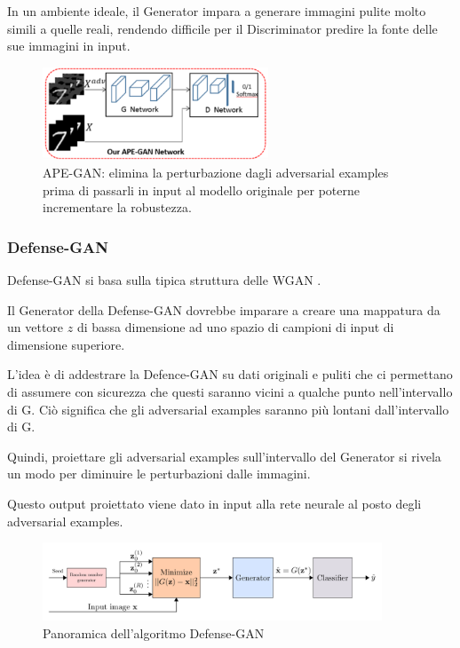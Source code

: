        In un ambiente ideale, il Generator impara a generare immagini pulite molto simili a quelle reali, rendendo difficile per il Discriminator predire la fonte delle sue immagini in input.
        \begin{figure}[!h]
            \centering
            \includegraphics[width=0.6\textwidth]{Images/Mitigation/APE-GAN.png}
            \caption{APE-GAN: elimina la perturbazione dagli adversarial examples prima di passarli in input al modello originale per poterne incrementare la robustezza.}
            \label{APE-GAN}
        \end{figure}
        
        \subsubsection{Defense-GAN}
        Defense-GAN %
        \cite{samangouei2018defense} si basa sulla tipica struttura delle WGAN %
        \cite{arjovsky2017wasserstein}. 
        
        Il Generator della Defense-GAN dovrebbe imparare a creare una mappatura da un vettore $z$ di bassa dimensione ad uno spazio di campioni di input di dimensione superiore.
        
        L'idea è di addestrare la Defence-GAN su dati originali e puliti che ci permettano di assumere con sicurezza che questi saranno vicini a qualche punto nell'intervallo di G. Ciò significa che gli adversarial examples saranno più lontani dall'intervallo di G. 
        
        Quindi, proiettare gli adversarial examples sull'intervallo del Generator si rivela un modo per diminuire le perturbazioni dalle immagini.
        
        Questo output proiettato viene dato in input alla rete neurale al posto degli adversarial examples.
            \begin{figure}[!h]
                \centering \includegraphics[width=0.9\textwidth]{Images/Mitigation/Defense-GAN.png}
                \caption{Panoramica dell'algoritmo Defense-GAN}
                \label{Defense-GAN}
            \end{figure}
        \newpage
        
